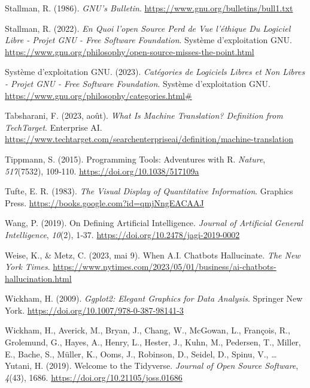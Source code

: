 \documentclass[
  letterpaper,
  DIV=11,
  numbers=noendperiod]{scrreprt}
\newlength{\cslhangindent}
\newenvironment{CSLReferences}[2] %
 {\begin{list}{}{%
  \setlength{\itemindent}{0pt}
  \setlength{\leftmargin}{0pt}
  \setlength{\parsep}{0pt}
  \ifodd #1
   \setlength{\leftmargin}{\cslhangindent}
   \setlength{\itemindent}{-1\cslhangindent}
  \fi
  \setlength{\itemsep}{#2\baselineskip}}}
 {\end{list}}
\begin{document}
\begin{CSLReferences}{1}{0}
Stallman, R. (1986). \emph{{GNU}'s {Bulletin}}.
\url{https://www.gnu.org/bulletins/bull1.txt}

Stallman, R. (2022). \emph{En Quoi l'open Source Perd de Vue l'éthique
Du Logiciel Libre - {Projet GNU} - {Free Software Foundation}}. Système
d'exploitation GNU.
\url{https://www.gnu.org/philosophy/open-source-misses-the-point.html}

Système d'exploitation GNU. (2023). \emph{Catégories de Logiciels Libres
et Non Libres - {Projet GNU} - {Free Software Foundation}}. Système
d'exploitation GNU.
\url{https://www.gnu.org/philosophy/categories.html\#}

Tabsharani, F. (2023, août). \emph{What Is {Machine Translation}?
{Definition} from {TechTarget}}. Enterprise AI.
\url{https://www.techtarget.com/searchenterpriseai/definition/machine-translation}

Tippmann, S. (2015). Programming Tools: {Adventures} with {R}.
\emph{Nature}, \emph{517}(7532), 109‑110.
\url{https://doi.org/10.1038/517109a}

Tufte, E. R. (1983). \emph{The {Visual Display} of {Quantitative
Information}}. Graphics Press.
\url{https://books.google.com?id=qmjNngEACAAJ}

Wang, P. (2019). On {Defining Artificial Intelligence}. \emph{Journal of
Artificial General Intelligence}, \emph{10}(2), 1‑37.
\url{https://doi.org/10.2478/jagi-2019-0002}

Weise, K., \& Metz, C. (2023, mai 9). When {A}.{I}. {Chatbots
Hallucinate}. \emph{The New York Times}.
\url{https://www.nytimes.com/2023/05/01/business/ai-chatbots-hallucination.html}

Wickham, H. (2009). \emph{Ggplot2: {Elegant Graphics} for {Data
Analysis}}. Springer New York.
\url{https://doi.org/10.1007/978-0-387-98141-3}

Wickham, H., Averick, M., Bryan, J., Chang, W., McGowan, L., François,
R., Grolemund, G., Hayes, A., Henry, L., Hester, J., Kuhn, M., Pedersen,
T., Miller, E., Bache, S., Müller, K., Ooms, J., Robinson, D., Seidel,
D., Spinu, V., \ldots{} Yutani, H. (2019). Welcome to the {Tidyverse}.
\emph{Journal of Open Source Software}, \emph{4}(43), 1686.
\url{https://doi.org/10.21105/joss.01686}


\end{CSLReferences}
\end{document}
